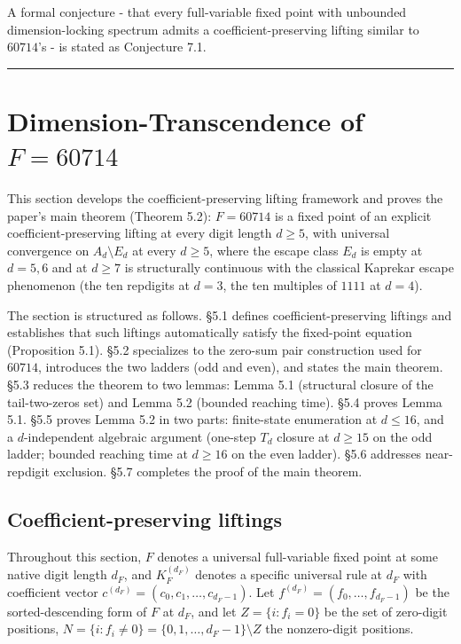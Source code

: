 \documentclass[11pt,letterpaper]{article}
\theoremstyle{paperstyle}
\theoremstyle{paperstyledef}
\theoremstyle{paperstylerem}
\begin{document}
A formal conjecture - that every full-variable fixed point with
unbounded dimension-locking spectrum admits a coefficient-preserving
lifting similar to \(60714\)'s - is stated as Conjecture 7.1.

\begin{center}\rule{0.5\linewidth}{0.5pt}\end{center}

\hypertarget{dimension-transcendence-of-f-60714}{%
\section{Dimension-Transcendence of \(F = 60714\)}\label{dimension-transcendence-of-f-60714}}

This section develops the coefficient-preserving lifting framework and
proves the paper's main theorem (Theorem 5.2): \(F = 60714\) is a fixed
point of an explicit coefficient-preserving lifting at every digit
length \(d \geq 5\), with universal convergence on \(A_d \setminus E_d\)
at every \(d \geq 5\), where the escape class \(E_d\) is empty at
\(d = 5, 6\) and at \(d \geq 7\) is structurally continuous with the
classical Kaprekar escape phenomenon (the ten repdigits at \(d = 3\),
the ten multiples of \(1111\) at \(d = 4\)).

The section is structured as follows. §5.1 defines
coefficient-preserving liftings and establishes that such liftings
automatically satisfy the fixed-point equation (Proposition 5.1). §5.2
specializes to the zero-sum pair construction used for \(60714\),
introduces the two ladders (odd and even), and states the main theorem.
§5.3 reduces the theorem to two lemmas: Lemma 5.1 (structural closure of
the tail-two-zeros set) and Lemma 5.2 (bounded reaching time). §5.4
proves Lemma 5.1. §5.5 proves Lemma 5.2 in two parts: finite-state
enumeration at \(d \leq 16\), and a \(d\)-independent algebraic argument
(one-step \(T_d\) closure at \(d \geq 15\) on the odd ladder; bounded
reaching time at \(d \geq 16\) on the even ladder). §5.6 addresses
near-repdigit exclusion. §5.7 completes the proof of the main theorem.

\hypertarget{coefficient-preserving-liftings}{%
\subsection{Coefficient-preserving liftings}\label{coefficient-preserving-liftings}}

Throughout this section, \(F\) denotes a universal full-variable fixed
point at some native digit length \(d_F\), and \(K_{F}^{(d_{F})}\)
denotes a specific universal rule at \(d_F\) with coefficient vector
\(c^{(d_{F})} = (c_0, c_1, \ldots, c_{d_{F} - 1})\). Let
\(f^{(d_{F})} = (f_0, \ldots, f_{d_{F} - 1})\) be the sorted-descending
form of \(F\) at \(d_F\), and let \(Z = \{i : f_i = 0\}\) be the set of
zero-digit positions,
\(N = \{i : f_i \neq 0\} = \{0, 1, \ldots, d_F - 1\} \setminus Z\) the
nonzero-digit positions.
\end{document}
